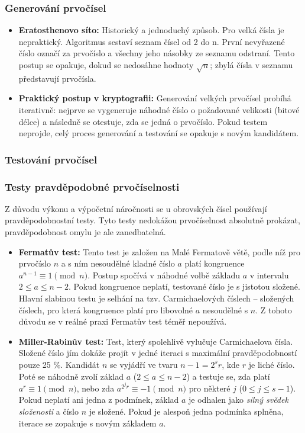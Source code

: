         \subsubsection{Generování prvočísel}
            \begin{itemize}
                \item \textbf{Eratosthenovo síto:} Historický a jednoduchý způsob. Pro velká čísla je nepraktický. Algoritmus sestaví seznam čísel od 2 do n. První nevyřazené číslo označí za prvočíslo a všechny jeho násobky ze seznamu odstraní. Tento postup se opakuje, dokud se nedosáhne hodnoty $\sqrt{n}$; zbylá čísla v seznamu představují prvočísla.
                \item \textbf{Praktický postup v kryptografii:} Generování velkých prvočísel probíhá iterativně: nejprve se vygeneruje náhodné číslo o požadované velikosti (bitové délce) a následně se otestuje, zda se jedná o prvočíslo. Pokud testem neprojde, celý proces generování a testování se opakuje s novým kandidátem.
            \end{itemize}
        \subsubsection{Testování prvočísel}
            \subsubsection*{Testy pravděpodobné prvočíselnosti}
                Z důvodu výkonu a výpočetní náročnosti se u obrovských čísel používají pravděpodobnostní testy. Tyto testy nedokážou prvočíselnost absolutně prokázat, pravděpodobnost omylu je ale zanedbatelná.
                \begin{itemize}
                    \item \textbf{Fermatův test:} Tento test je založen na Malé Fermatově větě, podle níž pro prvočíslo $n$ a s ním nesoudělné kladné číslo $a$ platí kongruence $a^{n-1} \equiv 1 \pmod{n}$. Postup spočívá v náhodné volbě základu $a$ v intervalu $2 \le a \le n - 2$. Pokud kongruence neplatí, testované číslo je s jistotou složené. Hlavní slabinou testu je selhání na tzv. Carmichaelových číslech -- složených číslech, pro která kongruence platí pro libovolné $a$ nesoudělné s $n$. Z tohoto důvodu se v reálné praxi Fermatův test téměř nepoužívá.
                    
                    \item \textbf{Miller-Rabinův test:} Test, který spolehlivě vylučuje Carmichaelova čísla. Složené číslo jím dokáže projít v jedné iteraci s maximální pravděpodobností pouze 25 \%. Kandidát $n$ se vyjádří ve tvaru $n - 1 = 2^s r$, kde $r$ je liché číslo. Poté se náhodně zvolí základ $a$ ($2 \le a \le n - 2$) a testuje se, zda platí $a^r \equiv 1 \pmod{n}$, nebo zda $a^{2^j r} \equiv -1 \pmod{n}$ pro některé $j$ ($0 \le j \le s - 1$). Pokud neplatí ani jedna z podmínek, základ $a$ je odhalen jako \textit{silný svědek složenosti} a číslo $n$ je složené. Pokud je alespoň jedna podmínka splněna, iterace se zopakuje s novým základem $a$.
                \end{itemize}
